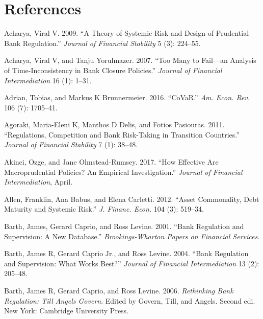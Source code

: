 \documentclass[
  10pt,
]{article}
\begin{document}
\hypertarget{references-1}{%
\section{References}\label{references-1}}

\setlength{\parindent}{-0.2in}
\setlength{\leftskip}{0.2in}
\setlength{\parskip}{8pt}
\vspace*{-0.2in}

\noindent

\hypertarget{refs}{}
\leavevmode\hypertarget{ref-Acharya2009}{}%
Acharya, Viral V. 2009. ``A Theory of Systemic Risk and Design of
Prudential Bank Regulation.'' \emph{Journal of Financial Stability} 5
(3): 224--55.

\leavevmode\hypertarget{ref-Acharya2007}{}%
Acharya, Viral V, and Tanju Yorulmazer. 2007. ``Too Many to Fail---an
Analysis of Time-Inconsistency in Bank Closure Policies.'' \emph{Journal
of Financial Intermediation} 16 (1): 1--31.

\leavevmode\hypertarget{ref-Adrian2016}{}%
Adrian, Tobias, and Markus K Brunnermeier. 2016. ``CoVaR.'' \emph{Am.
Econ. Rev.} 106 (7): 1705--41.

\leavevmode\hypertarget{ref-Agoraki2011}{}%
Agoraki, Maria-Eleni K, Manthos D Delis, and Fotios Pasiouras. 2011.
``Regulations, Competition and Bank Risk-Taking in Transition
Countries.'' \emph{Journal of Financial Stability} 7 (1): 38--48.

\leavevmode\hypertarget{ref-Akinci2017}{}%
Akinci, Ozge, and Jane Olmstead-Rumsey. 2017. ``How Effective Are
Macroprudential Policies? An Empirical Investigation.'' \emph{Journal of
Financial Intermediation}, April.

\leavevmode\hypertarget{ref-Allen2012}{}%
Allen, Franklin, Ana Babus, and Elena Carletti. 2012. ``Asset
Commonality, Debt Maturity and Systemic Risk.'' \emph{J. Financ. Econ.}
104 (3): 519--34.

\leavevmode\hypertarget{ref-Barth2001}{}%
Barth, James, Gerard Caprio, and Ross Levine. 2001. ``Bank Regulation
and Supervision: A New Database.'' \emph{Brookings-Wharton Papers on
Financial Services}.

\leavevmode\hypertarget{ref-Barth2004}{}%
Barth, James R, Gerard Caprio Jr., and Ross Levine. 2004. ``Bank
Regulation and Supervision: What Works Best?'' \emph{Journal of
Financial Intermediation} 13 (2): 205--48.

\leavevmode\hypertarget{ref-Barth2006}{}%
Barth, James R, Gerard Caprio, and Ross Levine. 2006. \emph{Rethinking
Bank Regulation: Till Angels Govern}. Edited by Govern, Till, and
Angels. Second edi. New York: Cambridge University Press.
\end{document}
